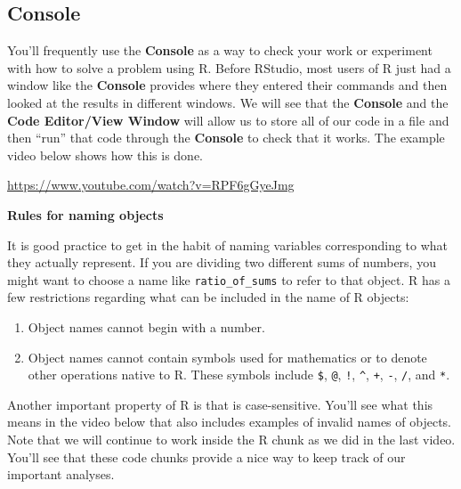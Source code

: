 \documentclass[]{tufte-book}
\providecommand{\tightlist}{%
  \setlength{\itemsep}{0pt}\setlength{\parskip}{0pt}}
\begin{document}
\subsection{Console}\label{console}

You'll frequently use the \textbf{Console} as a way to check your work or experiment with how to solve a problem using R. Before RStudio, most users of R just had a window like the \textbf{Console} provides where they entered their commands and then looked at the results in different windows. We will see that the \textbf{Console} and the \textbf{Code Editor/View Window} will allow us to store all of our code in a file and then ``run'' that code through the \textbf{Console} to check that it works. The example video below shows how this is done.

\vspace{0.1in}\begin{center}\footnotesize{\url{https://www.youtube.com/watch?v=RPF6gGyeJmg}}\end{center}\vspace{0.1in}

\vspace*{0.2in}

\noindent\textbf{Rules for naming objects}\vspace*{0.1in}

It is good practice to get in the habit of naming variables corresponding to what they actually represent. If you are dividing two different sums of numbers, you might want to choose a name like \texttt{ratio\_of\_sums} to refer to that object. R has a few restrictions regarding what can be included in the name of R objects:

\begin{enumerate}
\def\labelenumi{\arabic{enumi}.}
\tightlist
\item
  Object names cannot begin with a number.
\item
  Object names cannot contain symbols used for mathematics or to denote other operations native to R. These symbols include \texttt{\$}, \texttt{@}, \texttt{!}, \texttt{\^{}}, \texttt{+}, \texttt{-}, \texttt{/}, and \texttt{*}.
\end{enumerate}

Another important property of R is that is case-sensitive. You'll see what this means in the video below that also includes examples of invalid names of objects. Note that we will continue to work inside the R chunk as we did in the last video. You'll see that these code chunks provide a nice way to keep track of our important analyses.
\end{document}
